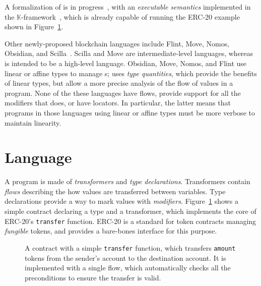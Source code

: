 \documentclass[dvipsnames,runningheads]{llncs}
\begin{document}
A formalization of \langName is in progress~\cite{psamatheRepo}, with an \emph{executable semantics} implemented in the $\mathbb{K}$-framework~\cite{rosu-serbanuta-2010-jlap}, which is already capable of running the ERC-20 example shown in Figure~\ref{fig:erc20-transfer-flow}.

Other newly-proposed blockchain languages include Flint, Move, Nomos, Obsidian, and Scilla~\cite{schrans2018flint,blackshear2019move,das2019nomos,coblenz2019obsidian,sergey2019scilla}.
Scilla and Move are intermediate-level languages, whereas \langName is intended to be a high-level language.
Obsidian, Move, Nomos, and Flint use linear or affine types to manage \assetTxt{}s; \langName uses \emph{type quantities}, which provide the benefits of linear types, but allow a more precise analysis of the flow of values in a program.
None of the these languages have flows, provide support for all the modifiers that \langName does, or have locators.
In particular, the latter means that programs in those languages using linear or affine types must be more verbose to maintain linearity.

\section{Language}\label{sec:lang}
A \langName program is made of \emph{transformers} and \emph{type declarations}.
Transformers contain \emph{flows} describing the how values are transferred between variables.
Type declarations provide a way to mark values with \emph{modifiers}. %
Figure~\ref{fig:erc20-transfer-flow} shows a simple contract declaring a type and a transformer, which implements the core of ERC-20's \lstinline{transfer} function.
ERC-20 is a standard for token contracts managing \emph{fungible} tokens, and provides a bare-bones interface for this purpose.

\begin{figure}
    \vspace{-2em}
    \centering
    
    \vspace{-1em}
    \caption{A \langName contract with a simple \lstinline{transfer} function, which transfers \lstinline{amount} tokens from the sender's account to the destination account.
It is implemented with a single flow, which automatically checks all the preconditions to ensure the transfer is valid.}
    \label{fig:erc20-transfer-flow}
    \vspace{-2em}
\end{figure}
\end{document}
